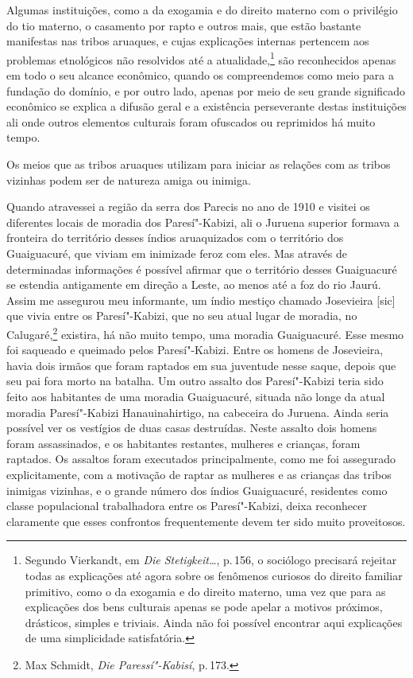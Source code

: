 Algumas instituições, como a da exogamia e do direito materno com o
privilégio do tio materno, o casamento por rapto e outros mais, que
estão bastante manifestas nas tribos aruaques, e cujas explicações
internas pertencem aos problemas etnológicos não resolvidos até a
atualidade,\footnote{Segundo Vierkandt, em \textit{Die Stetigkeit\ldots}, p.\,156, o sociólogo precisará rejeitar todas as
  explicações até agora sobre os fenômenos curiosos do direito familiar
  primitivo, como o da exogamia e do direito materno, uma vez que para
  as explicações dos bens culturais apenas se pode apelar a motivos
  próximos, drásticos, simples e triviais. Ainda não foi possível
  encontrar aqui explicações de uma simplicidade satisfatória.} são
reconhecidos apenas em todo o seu alcance econômico, quando os
compreendemos como meio para a fundação do domínio, e por outro lado,
apenas por meio de seu grande significado econômico se explica a difusão
geral e a existência perseverante destas instituições ali onde outros
elementos culturais foram ofuscados ou reprimidos há muito tempo.

Os meios que as tribos aruaques utilizam para iniciar as relações com as
tribos vizinhas podem ser de natureza amiga ou inimiga.

Quando atravessei a região da serra dos Parecis no ano de 1910 e visitei
os diferentes locais de moradia dos Paresí"-Kabizi, ali o Juruena
superior formava a fronteira do território desses índios aruaquizados
com o território dos Guaiguacuré, que viviam em inimizade feroz com
eles. Mas através de determinadas informações é possível afirmar que o
território desses Guaiguacuré se estendia antigamente em direção a
Leste, ao menos até a foz do rio Jaurú. Assim me assegurou meu
informante, um índio mestiço chamado Josevieira {[}sic{]} que vivia
entre os Paresí"-Kabizi, que no seu atual lugar de moradia, no
Calugaré,\footnote{Max Schmidt, \textit{Die Paressí"-Kabisí}, p.\,173.}
existira, há não muito tempo, uma moradia Guaiguacuré. Esse mesmo foi
saqueado e queimado pelos Paresí"-Kabizi. Entre os homens de Josevieira,
havia dois irmãos que foram raptados em sua juventude nesse saque,
depois que seu pai fora morto na batalha. Um outro assalto dos
Paresí"-Kabizi teria sido feito aos habitantes de uma moradia
Guaiguacuré, situada não longe da atual moradia Paresí"-Kabizi
Hanauinahirtigo, na cabeceira do Juruena. Ainda seria possível ver os
vestígios de duas casas destruídas. Neste assalto dois homens foram
assassinados, e os habitantes restantes, mulheres e crianças, foram
raptados. Os assaltos foram executados principalmente, como me foi
assegurado explicitamente, com a motivação de raptar as mulheres e as
crianças das tribos inimigas vizinhas, e o grande número dos índios
Guaiguacuré, residentes como classe populacional trabalhadora entre os
Paresí"-Kabizi, deixa reconhecer claramente que esses confrontos
frequentemente devem ter sido muito proveitosos. 

